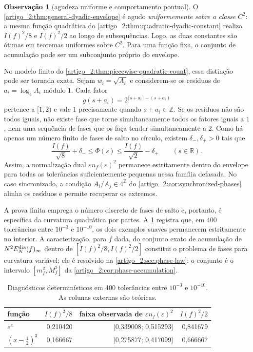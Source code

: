 \documentclass[12pt,a4paper]{article}
\theoremstyle{preciso}
\theoremstyle{definition}
\theoremstyle{preciso}
\theoremstyle{preciso}
\theoremstyle{preciso}
\theoremstyle{preciso}
\theoremstyle{definition}
\theoremstyle{preciso}
\theoremstyle{definition}
\newtheorem{remark}[teorema]{Observação}
\theoremstyle{preciso}
\theoremstyle{preciso}
\theoremstyle{definition}
\begin{document}
\begin{remark}[agudeza uniforme e comportamento pontual]\label{map:artigo_2:12.4}
\label{artigo_2:rem:envelope-not-pointwise}
O \cref{artigo_2:thm:general-dyadic-envelope} é agudo \emph{uniformemente sobre a
classe} $C^2$: a mesma função quadrática do
\cref{artigo_2:thm:quadratic-dyadic-constant} realiza $I(f)^2/8$ e $I(f)^2/2$ ao longo
de subsequências. Logo, as duas constantes são ótimas em teoremas uniformes
sobre $C^2$. Para uma função fixa, o conjunto de acumulação pode ser um
subconjunto próprio do envelope.

No modelo finito do \cref{artigo_2:thm:piecewise-quadratic-count}, essa distinção pode
ser tornada exata. Sejam $w_i=\sqrt{A_i}$ e considerem-se os resíduos de
$a_i=\log_4A_i$ módulo $1$. Cada fator
\[
 g(s+a_i)=2^{\lceil s+a_i\rceil-(s+a_i)}
\]
pertence a $[1,2)$ e vale $1$ precisamente quando $s+a_i\in\mathbb Z$. Se os
resíduos não são todos iguais, não existe fase que torne simultaneamente
todos os fatores iguais a $1$, nem uma sequência de fases que os faça tender
simultaneamente a $2$. Como há apenas um número finito de fases de salto no
círculo, existem $\delta_-,\delta_+>0$ tais que
\[
 \frac{I(f)}{\sqrt8}+\delta_-
 \le \Phi(s)
 \le \frac{I(f)}{\sqrt2}-\delta_+
 \qquad(s\in\mathbb R).
\]
Assim, a normalização dual $\varepsilon n_f(\varepsilon)^2$ permanece
estritamente dentro do envelope para todas as tolerâncias suficientemente
pequenas nessa família defasada. No caso sincronizado, a condição
$A_i/A_j\in4^{\mathbb Z}$ do \cref{artigo_2:cor:synchronized-phases} alinha os
resíduos e permite recuperar os extremos.

A prova finita emprega o número discreto de fases de salto e, portanto, é
específica da curvatura quadrática por partes. A
\cref{artigo_2:tab:smooth-diagnostics} registra que, em $400$ tolerâncias entre
$10^{-3}$ e $10^{-10}$, os dois exemplos suaves permanecem estritamente no
interior. A caracterização, para $f$ dada, do conjunto exato de acumulação de
$N^2E_N^{\rm dia}(f)_\infty$ dentro de
$[I(f)^2/8,\allowbreak I(f)^2/2]$ constitui o problema de fases para curvatura
variável; ele é resolvido na \cref{artigo_2:sec:phase-law}: o conjunto é o
intervalo $[m_f^2,M_f^2]$ da \cref{artigo_2:cor:phase-accumulation}.
\end{remark}

\begin{table}[t]
 \centering
 \caption{Diagnósticos determinísticos em 400 tolerâncias entre
 $10^{-3}$ e $10^{-10}$. As colunas externas são teóricas.}
 \label{artigo_2:tab:smooth-diagnostics}
 \small
 \begin{tabular}{lrrr}
\toprule
função & $I(f)^2/8$ & faixa observada de $\varepsilon n_f(\varepsilon)^2$ & $I(f)^2/2$ \\
\midrule
$e^x$ & 0{,}210420 & [0{,}339008; 0{,}515293] & 0{,}841679 \\
$(x-\frac{1}{2})^3$ & 0{,}166667 & [0{,}275877; 0{,}417099] & 0{,}666667 \\
\bottomrule
\end{tabular}

\end{table}
\end{document}
